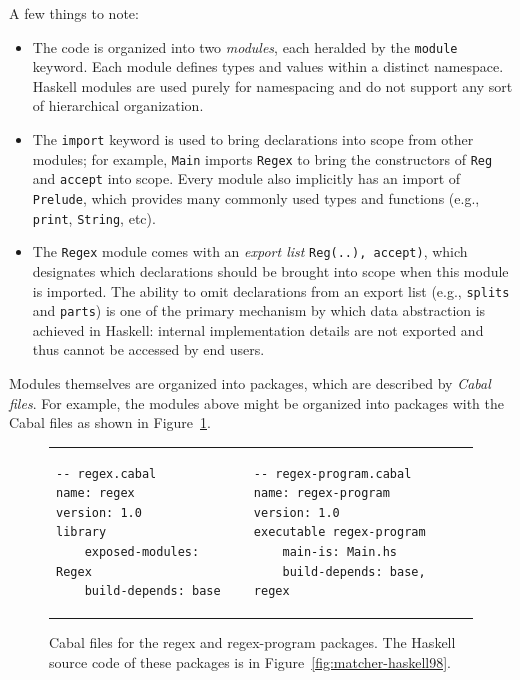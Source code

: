A few things to note:

\begin{itemize}
    \item The code is organized into two \emph{modules}, each heralded
    by the \verb|module| keyword.  Each module defines types and values
    within a distinct namespace.  Haskell modules are used purely for
    namespacing and do not support any sort of hierarchical organization.

    \item The \verb|import| keyword is used to bring declarations into
    scope from other modules; for example, \verb|Main| imports \verb|Regex|
    to bring the constructors of \verb|Reg| and \verb|accept| into scope.
    Every module also implicitly has an import of \verb|Prelude|, which
    provides many commonly used types and functions (e.g., \verb|print|,
    \verb|String|, etc).

    \item The \verb|Regex| module comes with an \emph{export list}
    \verb|Reg(..), accept)|, which designates which declarations should
    be brought into scope when this module is imported.  The ability to
    omit declarations from an export list (e.g., \verb|splits| and \verb|parts|)
    is one of the primary mechanism by which data abstraction is achieved in
    Haskell: internal implementation details are not exported and thus
    cannot be accessed by end users.
\end{itemize}

Modules themselves are organized into packages, which are described by
\emph{Cabal files}.  For example, the modules above might be organized into
packages with the Cabal files as shown in Figure~\ref{fig:matcher-packages}.

\begin{figure}
\begin{tabular}{p{} p{}}
\begin{lstlisting}[language=Cabal]
-- regex.cabal
name: regex
version: 1.0
library
    exposed-modules: Regex
    build-depends: base
\end{lstlisting}
&
\begin{lstlisting}[language=Cabal]
-- regex-program.cabal
name: regex-program
version: 1.0
executable regex-program
    main-is: Main.hs
    build-depends: base, regex
\end{lstlisting}
\end{tabular}
\caption{Cabal files for the regex and regex-program packages. The Haskell source code
of these packages is in Figure~\ref{fig:matcher-haskell98}.}
\label{fig:matcher-packages}
\end{figure}

